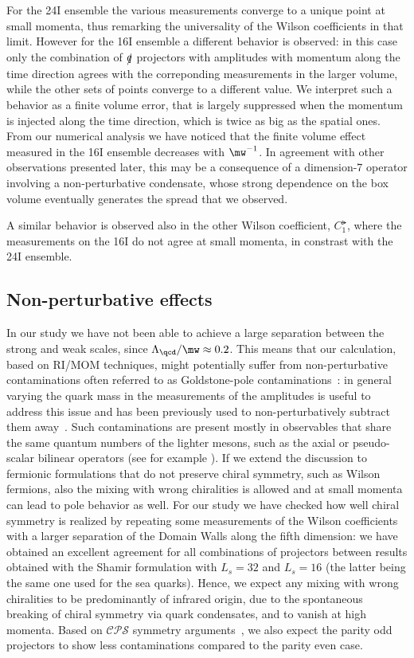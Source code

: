 \documentclass[aps,prd,twocolumn,nofootinbib,showpacs,superscriptaddress]{revtex4-1}
\begin{document}
For the 24I ensemble the various measurements converge to a unique point 
at small momenta, thus remarking the universality of the Wilson coefficients
in that limit. However for the 16I ensemble a different behavior is observed: in this
case only the combination of $\slashed{q}$ projectors with amplitudes with
momentum along the time direction agrees with the correponding measurements in
the larger volume, while the other sets of points converge to a different value.
We interpret such a behavior as a finite volume error, 
that is largely suppressed when the momentum
is injected along the time direction, which is twice as big as the spatial ones.
From our numerical analysis we have noticed that 
the finite volume effect measured in the 16I ensemble decreases 
with $\mw^{-1}$. In agreement with other observations presented later,
 this may be a consequence of a dimension-7 operator involving 
a non-perturbative condensate, whose strong dependence on the box volume
eventually generates the spread that we observed.

A similar behavior is observed also in the other Wilson coefficient, $C_1^\lat$, 
where the measurements on the 16I do not agree at small momenta, in constrast with 
the 24I ensemble.

\subsection{Non-perturbative effects}


In our study we have not been able
to achieve a large separation between the strong and weak scales, 
since $\Lambda_\qcd / \mw \approx 0.2$. 
This means that our calculation, based on RI/MOM techniques,
might potentially suffer from non-perturbative contaminations
often referred to as Goldstone-pole contaminations~\cite{Martinelli:1994ty,Aoki:2007xm}:
in general varying the quark mass in the measurements of the amplitudes
is useful to address this issue and has been previously used 
to non-perturbatively subtract them away~\cite{Becirevic:2004ny}.
Such contaminations are present mostly 
in observables that share the same quantum numbers of the lighter mesons,
such as the axial or pseudo-scalar bilinear operators (see for example ).
If we extend the discussion to fermionic formulations 
that do not preserve chiral symmetry, such as Wilson fermions, 
also the mixing with wrong chiralities is allowed and at small
momenta can lead to pole behavior as well. For our study we have checked
how well chiral symmetry is realized by repeating some measurements of the 
Wilson coefficients with a larger separation of the Domain Walls along 
the fifth dimension: we have obtained an excellent agreement for all combinations
of projectors between results obtained with the Shamir formulation with $L_s=32$
and $L_s=16$ (the latter being the same one used for the sea quarks).
Hence, we expect any mixing with wrong chiralities to be predominantly 
of infrared origin, due to the spontaneous breaking of chiral symmetry 
via quark condensates, and to vanish at high momenta.
Based on $\mathcal{CPS}$ symmetry arguments~\cite{Bernard:1985wf,Bernard:1987pr,Donini:1999sf}, 
we also expect the 
parity odd projectors to show less contaminations compared 
to the parity even case.
\end{document}

